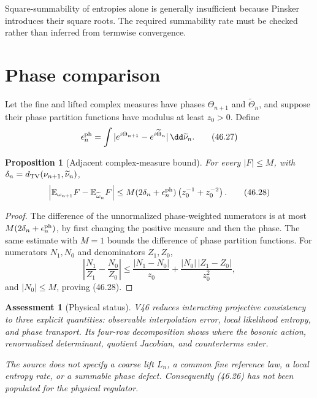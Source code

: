 \documentclass[11pt]{article}
\newtheorem{proposition}[theorem]{Proposition}
\newtheorem{assessment}[theorem]{Assessment}
\theoremstyle{remark}
\begin{document}
Square-summability of entropies alone is generally insufficient
because Pinsker introduces their square roots.  The required
summability rate must be checked rather than inferred from
termwise convergence.

\section{Phase comparison}

Let the fine and lifted complex measures have phases
\(\Theta_{n+1}\) and \(\widetilde\Theta_n\), and suppose their phase
partition functions have modulus at least \(z_0>0\).  Define
\[
 \epsilon_n^{\rm ph}
 =\int|e^{i\Theta_{n+1}}-e^{i\widetilde\Theta_n}|\,
       \dd\widetilde\nu_n.                               \tag{46.27}
\]

\begin{proposition}[Adjacent complex-measure bound]
\label{prop:v15v46-phase}
For every \(|F|\leq M\), with
\(\delta_n=d_{\rm TV}(\nu_{n+1},\widetilde\nu_n)\),
\[
 \left|
 \mathbb E_{\omega_{n+1}}F-
 \mathbb E_{\widetilde\omega_n}F
 \right|
 \leq
 M(2\delta_n+\epsilon_n^{\rm ph})
 \left(z_0^{-1}+z_0^{-2}\right).                        \tag{46.28}
\]
\end{proposition}

\begin{proof}
The difference of the unnormalized phase-weighted numerators is at
most \(M(2\delta_n+\epsilon_n^{\rm ph})\), by first changing the
positive measure and then the phase.  The same estimate with
\(M=1\) bounds the difference of phase partition functions.  For
numerators \(N_1,N_0\) and denominators \(Z_1,Z_0\),
\[
 \left|\frac{N_1}{Z_1}-\frac{N_0}{Z_0}\right|
 \leq\frac{|N_1-N_0|}{z_0}
 +\frac{|N_0|\,|Z_1-Z_0|}{z_0^2},
\]
and \(|N_0|\leq M\), proving (46.28).
\end{proof}

\begin{assessment}[Physical status]
\label{ass:v15v46-status}
V46 reduces interacting projective consistency to three explicit
quantities: observable interpolation error, local likelihood
entropy, and phase transport.  Its four-row decomposition shows
where the bosonic action, renormalized determinant, quotient
Jacobian, and counterterms enter.

The source does not specify a coarse lift \(L_n\), a common fine
reference law, a local entropy rate, or a summable phase defect.
Consequently (46.26) has not been populated for the physical
regulator.
\end{assessment}
\end{document}
